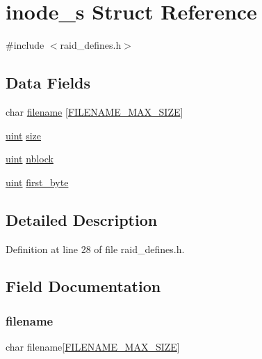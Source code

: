 \hypertarget{structinode__s}{}\section{inode\+\_\+s Struct Reference}
\label{structinode__s}


{\ttfamily \#include $<$raid\+\_\+defines.\+h$>$}

\subsection*{Data Fields}
\begin{DoxyCompactItemize}
\item 
char \hyperlink{structinode__s_a620f1f08587e3ad63c74a9fb90bb9be8}{filename} \mbox{[}\hyperlink{raid__defines_8h_a24c1405225e4ce27b24bcf4f32f4ff0e}{F\+I\+L\+E\+N\+A\+M\+E\+\_\+\+M\+A\+X\+\_\+\+S\+I\+ZE}\mbox{]}
\item 
\hyperlink{raid__defines_8h_a91ad9478d81a7aaf2593e8d9c3d06a14}{uint} \hyperlink{structinode__s_a22d26304a3b3aca97e6311f6939dd1bf}{size}
\item 
\hyperlink{raid__defines_8h_a91ad9478d81a7aaf2593e8d9c3d06a14}{uint} \hyperlink{structinode__s_afe7beb909cfc74858acbb6c26d5d0e00}{nblock}
\item 
\hyperlink{raid__defines_8h_a91ad9478d81a7aaf2593e8d9c3d06a14}{uint} \hyperlink{structinode__s_a4513cc558a2d925cd5b3023ea6b3ba62}{first\+\_\+byte}
\end{DoxyCompactItemize}


\subsection{Detailed Description}


Definition at line 28 of file raid\+\_\+defines.\+h.



\subsection{Field Documentation}
\mbox{\label{structinode__s_a620f1f08587e3ad63c74a9fb90bb9be8}} 
\subsubsection{\texorpdfstring{filename}{filename}}
{\footnotesize\ttfamily char filename\mbox{[}\hyperlink{raid__defines_8h_a24c1405225e4ce27b24bcf4f32f4ff0e}{F\+I\+L\+E\+N\+A\+M\+E\+\_\+\+M\+A\+X\+\_\+\+S\+I\+ZE}\mbox{]}}



